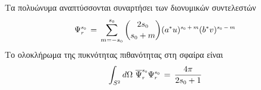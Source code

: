 Τα πολυώνυμα αναπτύσσονται συναρτήσει των διονυμικών συντελεστών
\begin{equation}\label{haldane wavefunction binomial}
    \Psi\subscr{r}\superscr{s\subscr{0}}\,=\,\sum\limits_{m=-s\subscr{0}}^{s\subscr{0}}\binom{2s\subscr{0}}{s\subscr{0}+m}(a\superscr{*}u)\superscr{s\subscr{0}+m}(b\superscr{*}v)\superscr{s\subscr{0}-m}
\end{equation}
Το ολοκλήρωμα της πυκνότητας πιθανότητας 
στη σφαίρα είναι
\begin{equation}
    \int_{S\superscr{2}} d\Omega \,\, \overline{\Psi}\subscr{r}\superscr{s\subscr{0}}\Psi\subscr{r}\superscr{s\subscr{0}}\,=\,\frac{4\pi}{2s\subscr{0}+1}
\end{equation}

